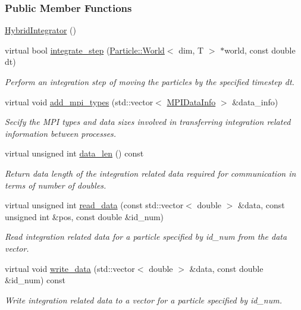 \subsubsection*{Public Member Functions}
\begin{DoxyCompactItemize}
\item 
\hyperlink{classps__mmm_1_1_particle_1_1_integrator_1_1_hybrid_integrator_a53e8b1efa9be3cfd8cfc069519ef3006}{Hybrid\+Integrator} ()
\item 
virtual bool \hyperlink{classps__mmm_1_1_particle_1_1_integrator_1_1_hybrid_integrator_a20bf466dd5b6bc09503f85705a000d62}{integrate\+\_\+step} (\hyperlink{classps__mmm_1_1_particle_1_1_world}{Particle\+::\+World}$<$ dim, T $>$ $\ast$world, const double dt)
\begin{DoxyCompactList}\small\item\em Perform an integration step of moving the particles by the specified timestep dt. \end{DoxyCompactList}\item 
virtual void \hyperlink{classps__mmm_1_1_particle_1_1_integrator_1_1_hybrid_integrator_a339276d89319725a53b9898f16592fb8}{add\+\_\+mpi\+\_\+types} (std\+::vector$<$ \hyperlink{classps__mmm_1_1_particle_1_1_m_p_i_data_info}{M\+P\+I\+Data\+Info} $>$ \&data\+\_\+info)
\begin{DoxyCompactList}\small\item\em Secify the M\+P\+I types and data sizes involved in transferring integration related information between processes. \end{DoxyCompactList}\item 
virtual unsigned int \hyperlink{classps__mmm_1_1_particle_1_1_integrator_1_1_hybrid_integrator_a1d8550c893c0cc3ad76c31a3bc38723f}{data\+\_\+len} () const 
\begin{DoxyCompactList}\small\item\em Return data length of the integration related data required for communication in terms of number of doubles. \end{DoxyCompactList}\item 
virtual unsigned int \hyperlink{classps__mmm_1_1_particle_1_1_integrator_1_1_hybrid_integrator_a0118c4409eb96a726866ddec7d52f14c}{read\+\_\+data} (const std\+::vector$<$ double $>$ \&data, const unsigned int \&pos, const double \&id\+\_\+num)
\begin{DoxyCompactList}\small\item\em Read integration related data for a particle specified by id\+\_\+num from the data vector. \end{DoxyCompactList}\item 
virtual void \hyperlink{classps__mmm_1_1_particle_1_1_integrator_1_1_hybrid_integrator_a0e757205a3708fe05979f9548e6a3b72}{write\+\_\+data} (std\+::vector$<$ double $>$ \&data, const double \&id\+\_\+num) const 
\begin{DoxyCompactList}\small\item\em Write integration related data to a vector for a particle specified by id\+\_\+num. \end{DoxyCompactList}\end{DoxyCompactItemize}


